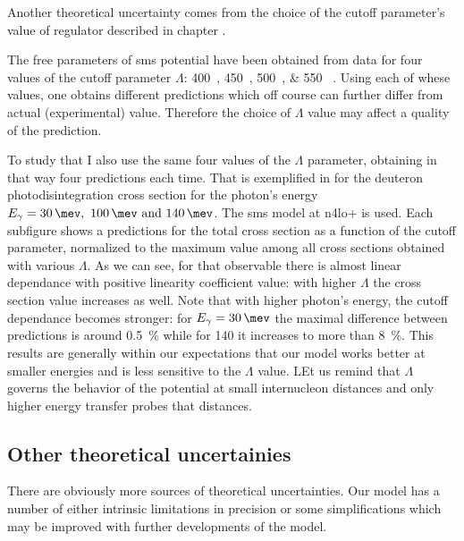     Another theoretical uncertainty comes from the choice of the cutoff parameter's value 
    of regulator described in chapter .

    The free parameters of \gls{sms} potential have been obtained from data for 
   four values of the cutoff parameter $\Lambda$:
   \SIlist[list-units = single]{400;450;500;550}{\mev} \cite{reinkrebs2018}.
   Using each of whese values, one obtains different predictions which off course can further differ 
   from actual (experimental) value. Therefore the choice of $\Lambda$ value
   may affect a quality of the prediction.

    To study that I also use the same four values of the $\Lambda$ parameter,
    obtaining in that way four predictions each time.
    That is exemplified in   for the deuteron photodisintegration cross section for the
    photon's energy $E_\gamma = \SIlist{30;100;140}{\mev}$.
    The \gls{sms} model at \gls{n4lo+} is used.
    Each subfigure shows a predictions for the total cross section as 
    a function of the cutoff parameter,
    normalized to the maximum value among all cross sections
    obtained with various $\Lambda$.
    As we can see, for that observable
    there is almost linear dependance with positive linearity coefficient value:
    with higher $\Lambda$ the cross section value increases as well.
    Note that with higher photon's energy,
    the cutoff dependance becomes stronger: for $E_\gamma=\SI{30}{\mev}$
    the maximal difference between predictions is around \SI{0.5}{\percent} while
    for \SI{140}{\mev} it increases to more than \SI{8}{\percent}. This results are
    generally within our expectations that our model works better at
    smaller energies
    and is less sensitive to the $\Lambda$ value. LEt us remind that $\Lambda$ 
    governs the behavior of the potential at small internucleon distances and only higher energy transfer probes that distances. 



    \subsection*{Other theoretical uncertainies}

    There are obviously more sources of theoretical uncertainties. 
    Our model has a number of either intrinsic limitations in precision or 
    some simplifications which may be improved with further developments of the model.
    

